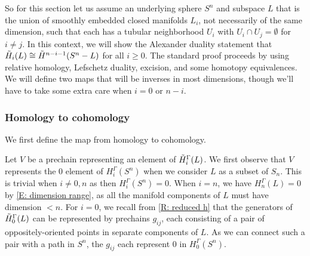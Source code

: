 \begin{example}
So for this section let us assume an underlying sphere $S^n$ and subspace $L$ that is the union of smoothly embedded closed manifolds $L_i$, not necessarily of the same dimension, such that each has a tubular neighborhood $U_i$ with $U_i \cap U_j = \emptyset$ for $i \neq j$.
In this context, we will show the Alexander duality statement that $\tilde H_i(L) \cong \tilde H^{n-i-1}(S^n-L)$ for all $i \geq 0$.
The standard proof proceeds by using relative homology, Lefschetz duality, excision, and some homotopy equivalences. We will define two maps that will be inverses in most dimensions, though we'll have to take some extra care when $i=0$ or $n-i$.

\begin{comment}
First, let $\mc K_i = \ker(H_i^\Gamma(L) \to H_i^\Gamma(S^n)$, where the map is induced by the inclusion $L \into S^n$.
In all degrees $i>0$, this will simply be $H_i(\Gamma(L))$.
For $0<i<n$, this follows immediately from the computation of the homology of spheres REF.
In dimension $n$, we observe that $H_n^\Gamma(L) = 0$ by \cref{E: dimension range}, as all the manifold components of $L$ must have dimension $<n$.
In degree $0$, if $L$ has $\ell$ components, we have the obvious surjection $H_0^\Gamma(L) \cong \Z^\ell
\to H_0^\Gamma(S^n) \cong \Z$, so the kernel $\mc K_0$ is isomorphic to $\Z^{\ell-1}$.
Generators of $\mc K_0$ can be represented by prechains consisting of pairs of points in separate components of $L$ with opposite orientations, as if they were in the same component then they would represent $0$ in $H_0^\Gamma(L)$.
If $g_{ij}$ is a homology class represented by a prechain with a positive point in component $L_i$ and a negative point in component $L_j$, then we also have the relations $g_{ij}+g_{jk}=g_{ik}$.
So we can take $\mc K_0$ to be the free abelian group on generators $g_{1i}$ of $i>1$ or on generators $g_{i,i+1}$ for $1\leq i\leq \ell-1$.
\end{comment}

\subsubsection{Homology to cohomology} We first define the map from homology to cohomology.

Let $V$ be a prechain representing an element of $\tilde H_i^\Gamma(L)$.
We first observe that $V$ represents the $0$ element of $H_i^\Gamma(S^n)$ when we consider $L$ as a subset of $S_n$.
This is trivial when $i \neq 0,n$ as then $H_i^\Gamma(S^n)=0$.
When $i = n$, we have $H_n^\Gamma(L) = 0$ by \cref{E: dimension range}, as all the manifold components of $L$ must have dimension $<n$.
For $i=0$, we recall from \cref{R: reduced h} that the generators of $\tilde H_0^\Gamma(L)$ can be represented by prechains $g_{ij}$, each consisting of a pair of oppositely-oriented points in separate components of $L$.
As we can connect such a pair with a path in $S^n$, the $g_{ij}$ each represent $0$ in $H_0^\Gamma(S^n)$.


\end{example}
